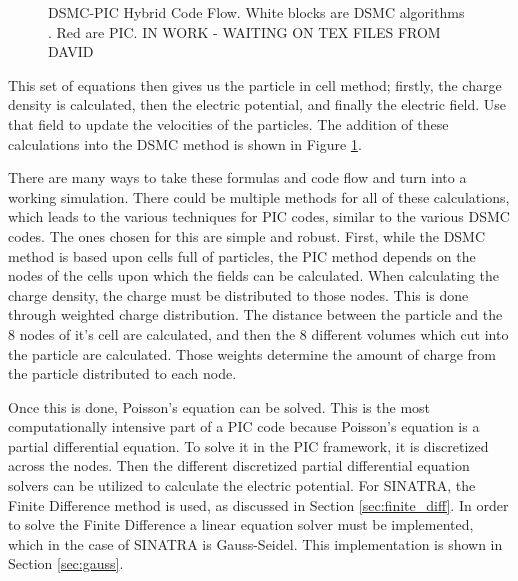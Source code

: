 \begin{figure}
\centering
    \caption[DSMC-PIC Hybrid Code Flow]{DSMC-PIC Hybrid Code Flow. White blocks are DSMC algorithms \cite{Galvez2018a}. Red are PIC. IN WORK - WAITING ON TEX FILES FROM DAVID}
    \label{fig:pic_flow}
\end{figure}

This set of equations then gives us the particle in cell method; firstly, the charge density is calculated, then the electric potential, and finally the electric field. Use that field to update the velocities of the particles. The addition of these calculations into the DSMC method is shown in Figure \ref{fig:pic_flow}.

\indent There are many ways to take these formulas and code flow and turn into a working simulation. There could be multiple methods for all of these calculations, which leads to the various techniques for PIC codes, similar to the various DSMC codes. The ones chosen for this are simple and robust. First, while the DSMC method is based upon cells full of particles, the PIC method depends on the nodes of the cells upon which the fields can be calculated. When calculating the charge density, the charge must be distributed to those nodes. This is done through weighted charge distribution. The distance between the particle and the 8 nodes of it's cell are calculated, and then the 8 different volumes which cut into the particle are calculated. Those weights determine the amount of charge from the particle distributed to each node. \par

\indent Once this is done, Poisson's equation can be solved. This is the most computationally intensive part of a PIC code because Poisson's equation is a partial differential equation. To solve it in the PIC framework, it is discretized across the nodes. Then the different discretized partial differential equation solvers can be utilized to calculate the electric potential. For SINATRA, the Finite Difference method is used, as discussed in Section \ref{sec:finite_diff}. In order to solve the Finite Difference a linear equation solver must be implemented, which in the case of SINATRA is Gauss-Seidel. This implementation is shown in Section \ref{sec:gauss}. \par

